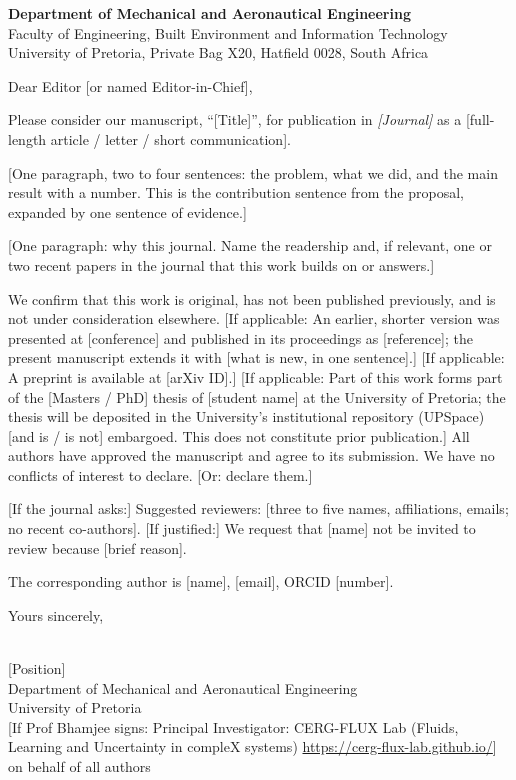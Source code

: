 \documentclass[11pt,a4paper]{article}
\newcommand{\letterhead}{%
  \textbf{Department of Mechanical and Aeronautical Engineering}\\
  Faculty of Engineering, Built Environment and Information Technology\\
  University of Pretoria, Private Bag X20, Hatfield 0028, South Africa}
\begin{document}
\letterhead

\vspace{1.5em}

\vspace{1em}
\noindent Dear Editor [or named Editor-in-Chief],

Please consider our manuscript, ``[Title]'', for publication in \emph{[Journal]} as a [full-length article / letter / short communication].

[One paragraph, two to four sentences: the problem, what we did, and the main result with a number. This is the contribution sentence from the proposal, expanded by one sentence of evidence.]

[One paragraph: why this journal. Name the readership and, if relevant, one or two recent papers in the journal that this work builds on or answers.]

We confirm that this work is original, has not been published previously, and is not under consideration elsewhere.
[If applicable: An earlier, shorter version was presented at [conference] and published in its proceedings as [reference]; the present manuscript extends it with [what is new, in one sentence].]
[If applicable: A preprint is available at [arXiv ID].]
[If applicable: Part of this work forms part of the [Masters / PhD] thesis of [student name] at the University of Pretoria; the thesis will be deposited in the University's institutional repository (UPSpace) [and is / is not] embargoed. This does not constitute prior publication.]
All authors have approved the manuscript and agree to its submission. We have no conflicts of interest to declare. [Or: declare them.]

[If the journal asks:] Suggested reviewers: [three to five names, affiliations, emails; no recent co-authors]. [If justified:] We request that [name] not be invited to review because [brief reason].

The corresponding author is [name], [email], ORCID [number].

Yours sincerely,

\vspace{3em}
\noindent [Name]\\{}
[Position]\\
Department of Mechanical and Aeronautical Engineering\\
University of Pretoria\\{}
[If Prof Bhamjee signs: Principal Investigator: CERG-FLUX Lab (Fluids, Learning and Uncertainty in compleX systems) \textbar{} \url{https://cerg-flux-lab.github.io/}]\\
on behalf of all authors
\end{document}
